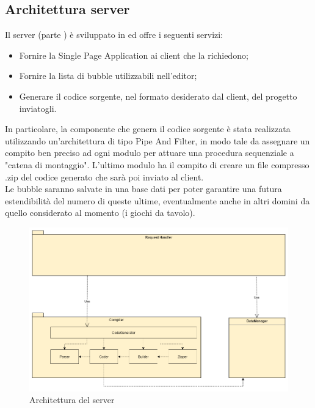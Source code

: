 \documentclass[../DefinizioneDiProdotto.tex]{subfiles}
\begin{document}
			\subsection{Architettura server}
				Il server (parte ) è sviluppato in  ed offre i seguenti servizi:
				\begin{itemize}
					\item Fornire la Single Page Application ai client che la richiedono;
					\item Fornire la lista di bubble utilizzabili nell'editor;
					\item Generare il codice sorgente, nel formato desiderato dal client, del progetto
					inviatogli.
				\end{itemize}
				In particolare, la componente che genera il codice sorgente è stata realizzata utilizzando
				un'architettura di tipo Pipe And Filter, in modo tale da assegnare un compito ben preciso
				ad ogni modulo per attuare una procedura sequenziale a "catena di montaggio". L'ultimo
				modulo ha il compito di creare un file compresso .zip del codice generato che sarà poi
				inviato al client.\\
				Le bubble saranno salvate in una base dati per poter garantire una futura estendibilità del
				numero di queste ultime, eventualmente anche in altri domini da quello considerato al
				momento (i giochi da tavolo).
				\begin{figure}[H]\label{fig:ServerSubsystem}
					\centering
					\includegraphics[scale=0.4]{Immagini/DiagrammaArchitettura/ServerSubsystem.png}
					\caption{Architettura del server}
				\end{figure}
\end{document}
